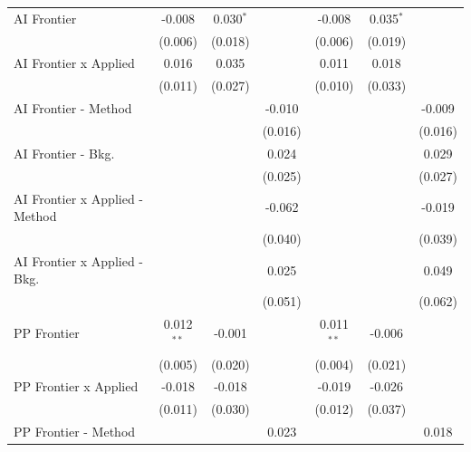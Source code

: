 \begin{tabular}{lcccccc}
   AI Frontier                    & -0.008       & 0.030$^{*}$ &                & -0.008       & 0.035$^{*}$ &   \\   
                                  & (0.006)      & (0.018)     &                & (0.006)      & (0.019)     &   \\   
   AI Frontier x Applied          & 0.016        & 0.035       &                & 0.011        & 0.018       &   \\   
                                  & (0.011)      & (0.027)     &                & (0.010)      & (0.033)     &   \\   
   AI Frontier - Method           &              &             & -0.010         &              &             & -0.009\\   
                                  &              &             & (0.016)        &              &             & (0.016)\\   
   AI Frontier - Bkg.             &              &             & 0.024          &              &             & 0.029\\   
                                  &              &             & (0.025)        &              &             & (0.027)\\   
   AI Frontier x Applied - Method &              &             & -0.062         &              &             & -0.019\\   
                                  &              &             & (0.040)        &              &             & (0.039)\\   
   AI Frontier x Applied - Bkg.   &              &             & 0.025          &              &             & 0.049\\   
                                  &              &             & (0.051)        &              &             & (0.062)\\   
   PP Frontier                    & 0.012$^{**}$ & -0.001      &                & 0.011$^{**}$ & -0.006      &   \\   
                                  & (0.005)      & (0.020)     &                & (0.004)      & (0.021)     &   \\   
   PP Frontier x Applied          & -0.018       & -0.018      &                & -0.019       & -0.026      &   \\   
                                  & (0.011)      & (0.030)     &                & (0.012)      & (0.037)     &   \\   
   PP Frontier - Method           &              &             & 0.023          &              &             & 0.018\\   

\end{tabular}
